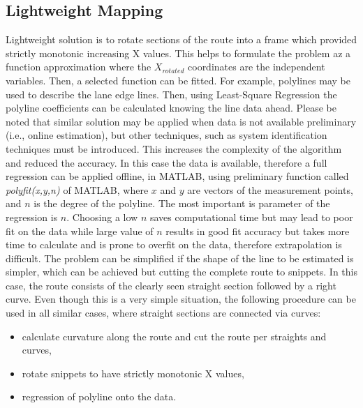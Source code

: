 \documentclass[sn-mathphys-num]{sn-jnl}%
\begin{document}
\subsection{Lightweight Mapping}
Lightweight solution is to rotate sections of the route into a frame which provided strictly monotonic increasing X values. This helps to formulate the 
problem az a function approximation where the $X_{rotated}$ coordinates are the independent variables. Then, a selected function can be fitted.
For example, polylines may be used to describe the lane edge lines. Then, using Least-Square Regression the polyline coefficients can be calculated knowing
the line data ahead. Please be noted that similar solution may be applied when data is not available preliminary (i.e., online estimation), but other techniques, 
such as system identification techniques must be introduced. This increases the complexity of the algorithm and reduced the accuracy. In this case the data 
is available, therefore a full regression can be applied offline, in MATLAB, using preliminary function called \emph{polyfit(x,y,n)} of MATLAB, where $x$ and $y$ are 
vectors of the measurement points, and $n$ is the degree of the polyline. The most important is parameter of the regression is $n$. Choosing a low $n$ saves computational 
time but may lead to poor fit on the data while large value of $n$ results in good fit accuracy but takes more time to calculate and is prone to overfit 
on the data, therefore extrapolation is difficult. The problem can be simplified if the shape of the line to be estimated is simpler, which can be achieved but 
cutting the complete route to snippets. In this case, the route consists of the clearly seen straight section followed by a right curve. Even though this is a very 
simple situation, the following procedure can be used in all similar cases, where straight sections are connected via curves:
\begin{itemize}
    \item calculate curvature along the route and cut the route per straights and curves,
    \item rotate snippets to have strictly monotonic X values,
    \item regression of polyline onto the data.
\end{itemize}
\end{document}
